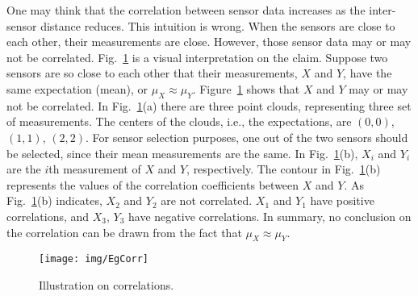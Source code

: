 
    One may think that the correlation between sensor data increases as the inter-sensor distance reduces. This intuition is wrong. When the sensors are close to each other, their measurements are close. However, those sensor data may or may not be correlated.
      Fig.~\ref{f:cor} is a visual interpretation on the claim. Suppose two sensors are so close to each other that their measurements, $X$ and $Y$, have the same expectation (mean), or $\mu_X \approx \mu_Y$. Figure~\ref{f:cor} shows that $X$ and $Y$ may or may not be correlated. In Fig.~\ref{f:cor}(a) there are three point clouds, representing three set of measurements. The centers of the clouds, i.e., the expectations, are $(0,0)$, $(1,1)$, $(2,2)$. For sensor selection purposes, one out of the two sensors should be selected, since their mean measurements are the same.
     In Fig.~\ref{f:cor}(b), $X_i$ and $Y_i$ are the $i$th measurement of $X$ and $Y$, respectively. The contour in Fig.~\ref{f:cor}(b) represents the values of the correlation coefficients between $X$ and $Y$.
     As Fig.~\ref{f:cor}(b) indicates, $X_2$ and $Y_2$ are not correlated. $X_1$ and $Y_1$ have positive correlations, and $X_3$, $Y_3$ have negative correlations. In summary, no conclusion on the correlation can be drawn from the fact that $\mu_X \approx \mu_Y$.

\begin{figure}
  \centering
  \texttt{[image: img/EgCorr]}\\
  \caption{Illustration on correlations.}\label{f:cor}
\end{figure}


